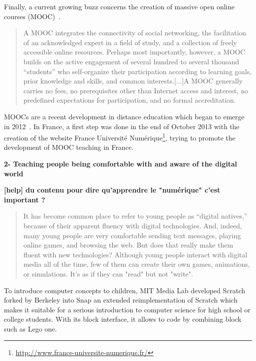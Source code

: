 Finally, a current growing buzz concerns the creation of massive open online courses (MOOC)~\cite{mackness2010ideals}.

\begin{quotation}
A MOOC integrates the connectivity of social networking, the facilitation of an acknowledged expert in a field of study, and a collection of freely accessible online resources. Perhaps most importantly, however, a MOOC builds on the active engagement of several hundred to several thousand “students” who self-organize their participation according to learning goals, prior knowledge and skills, and common interests.[...]A MOOC generally carries no fees, no prerequisites other than Internet access and interest, no predefined expectations for participation, and no formal accreditation.
\end{quotation}

MOOCs are a recent development in distance education which began to emerge in 2012~\cite{pappano2012year}. In France, a first step was done in the end of October 2013 with the creation of the website France Université Numérique\footnote{\url{http://www.france-universite-numerique.fr/}}, trying to promote the development of MOOC teaching in France.


\textbf{2- Teaching people being comfortable with and aware of the digital world}

\textbf{[help] du contenu pour dire qu'apprendre le "numérique" c'est important ?}

\begin{quotation}

    It has become common place to refer to young people as “digital natives,” because of their apparent fluency with digital technologies. And, indeed, many young people are very comfortable sending text messages, playing online games, and browsing the web. But does that really make them fluent with new technologies? Although young people interact with digital media all of the time, few of them can create their own games, animations, or simulations. It’s as if they can "read" but not "write".

\end{quotation}

To introduce computer concepts to children, MIT Media Lab developed Scratch~\cite{resnick2009scratch} forked by Berkeley into Snap an extended reimplementation of Scratch which makes it suitable for a serious introduction to computer science for high school or college students. With its block interface, it allows to code by combining block such as Lego one.


